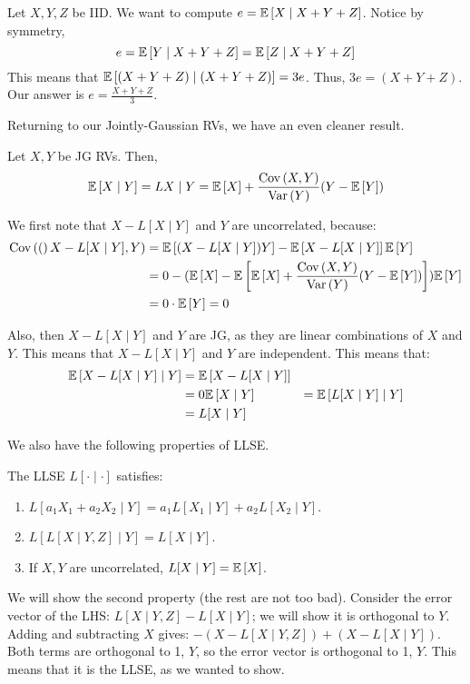 \begin{example}
    Let $X, Y, Z$ be IID. We want to compute $e = \mathbb{E}\left[ X \mid X + Y + Z \right]$. Notice by symmetry,
    \[ e = \mathbb{E}\left[ Y \mid X + Y + Z \right] = \mathbb{E}\left[ Z \mid X + Y + Z \right] \]
    This means that $\mathbb{E}\left[ (X + Y+ Z) \mid (X + Y + Z) \right] = 3e$. Thus, $3e = (X + Y + Z)$.
    Our answer is $e = \frac{X + Y+ Z}{3}$.
\end{example}

Returning to our Jointly-Gaussian RVs, we have an even cleaner result.

\begin{theorem}
    Let $X, Y$ be JG RVs. Then,
    \[ \mathbb{E}\left[ X \mid Y \right] = L{X \mid Y} = \mathbb{E}\left[ X \right] + \frac{\text{Cov}\left( X, Y \right)}{\text{Var}\left( Y \right)} ( Y- \mathbb{E}\left[ Y \right]) \]

    \begin{proof*}
        We first note that $X - L[X \mid Y]$ and $Y$ are uncorrelated, because:
        \begin{align*}
            \text{Cov}\left( ( \right)X - L[X \mid Y], Y) &= \mathbb{E}\left[ (X - L[X \mid Y]) Y \right] - \mathbb{E}\left[ X - L[X \mid Y] \right] \mathbb{E}\left[ Y \right] \\
            &= 0 - (\mathbb{E}\left[ X \right] - \mathbb{E}\left[ \mathbb{E}\left[ X \right] + \frac{\text{Cov}\left( X, Y \right)}{\text{Var}\left( Y \right)}(Y - \mathbb{E}\left[ Y \right]) \right]) \mathbb{E}\left[ Y \right] \\
            &= 0 \cdot \mathbb{E}\left[ Y \right] = 0
        \end{align*}

        Also, then $X - L[X \mid Y]$ and $Y$ are JG, as they are linear combinations of $X$ and $Y$. This means that $X - L[X \mid Y]$ and $Y$ are independent.
        This means that:
        \begin{align*}
            \mathbb{E}\left[ X - L[X \mid Y] \mid Y \right] &= \mathbb{E}\left[ X - L[X \mid Y] \right] \\
            &= 0
            \mathbb{E}\left[ X \mid Y \right] &= \mathbb{E}\left[ L[X \mid Y] \mid Y \right] \\
            &= L[X \mid Y]
        \end{align*}
    \end{proof*}
\end{theorem}

We also have the following properties of LLSE.
\begin{theorem}
    The LLSE $L[\cdot \mid \cdot]$ satisfies:
    \begin{enumerate}
        \item $L[a_1 X_1 + a_2 X_2 \mid Y] = a_1 L[X_1 \mid Y] + a_2 L[X_2 \mid Y]$.
        \item $L[L[X \mid Y, Z] \mid Y] = L[X \mid Y]$.
        \item If $X, Y$ are uncorrelated, $L[X \mid Y] = \mathbb{E}\left[ X \right]$.
    \end{enumerate}
    \begin{proof*}
        We will show the second property (the rest are not too bad). Consider the error vector of the LHS:
        $L[X \mid Y, Z] - L[X \mid Y]$; we will show it is orthogonal to $Y$. Adding and subtracting $X$ gives:
        $-(X - L[X \mid Y, Z]) + (X - L[X \mid Y])$. Both terms are orthogonal to 1, $Y$, so the error vector is orthogonal to 1, $Y$.
        This means that it is the LLSE, as we wanted to show.
    \end{proof*}
\end{theorem}

